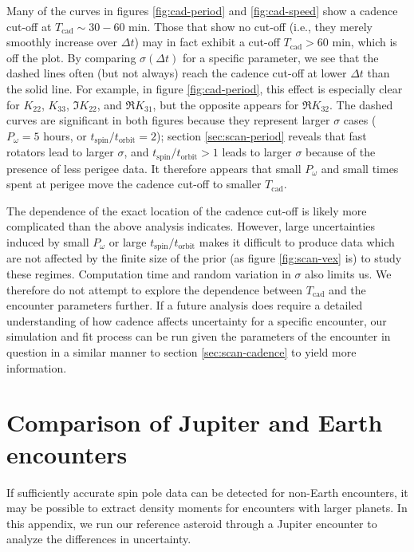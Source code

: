 \documentclass[fleqn,usenatbib]{mnras}
\begin{document}
Many of the curves in figures \ref{fig:cad-period} and \ref{fig:cad-speed} show a cadence cut-off at $T_\text{cad} \sim 30-60$ min. Those that show no cut-off (i.e., they merely smoothly increase over $\Delta t$) may in fact exhibit a cut-off $T_\text{cad} > 60$ min, which is off the plot. By comparing $\sigma(\Delta t)$ for a specific parameter, we see that the dashed lines often (but not always) reach the cadence cut-off at lower $\Delta t$ than the solid line. For example, in figure \ref{fig:cad-period}, this effect is especially clear for $K_{22}$, $K_{33}$, $\Im K_{22}$, and $\Re K_{31}$, but the opposite appears for $\Re K_{32}$. The dashed curves are significant in both figures because they represent larger $\sigma$ cases ($P_\omega=5$ hours, or $t_\text{spin}/t_\text{orbit}=2$); section \ref{sec:scan-period} reveals that fast rotators lead to larger $\sigma$, and $t_\text{spin}/t_\text{orbit} > 1$ leads to larger $\sigma$ because of the presence of less perigee data. It therefore appears that small $P_\omega$ and small times spent at perigee move the cadence cut-off to smaller $T_\text{cad}$.

The dependence of the exact location of the cadence cut-off is likely more complicated than the above analysis indicates. However, large uncertainties induced by small $P_\omega$ or large $t_\text{spin}/t_\text{orbit}$ makes it difficult to produce data which are not affected by the finite size of the prior (as figure \ref{fig:scan-vex} is) to study these regimes. Computation time and random variation in $\sigma$ also limits us. We therefore do not attempt to explore the dependence between $T_\text{cad}$ and the encounter parameters further. If a future analysis does require a detailed understanding of how cadence affects uncertainty for a specific encounter, our simulation and fit process can be run given the parameters of the encounter in question in a similar manner to section \ref{sec:scan-cadence} to yield more information. 


\section{Comparison of Jupiter and Earth encounters}
\label{app:jupiter-earth}

If sufficiently accurate spin pole data can be detected for non-Earth encounters, it may be possible to extract density moments for encounters with larger planets. In this appendix, we run our reference asteroid through a Jupiter encounter to analyze the differences in uncertainty.
\end{document}
